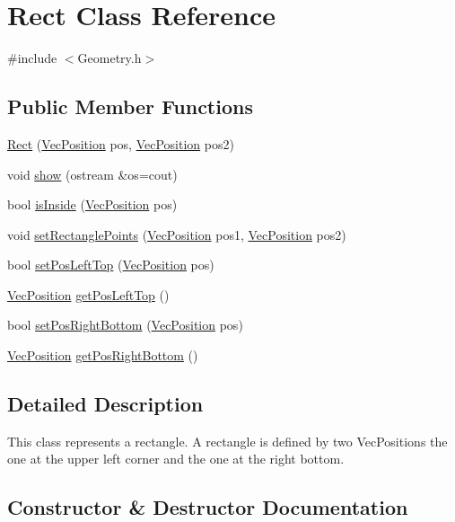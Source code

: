 \hypertarget{classRect}{}\section{Rect Class Reference}
\label{classRect}


{\ttfamily \#include $<$Geometry.\+h$>$}

\subsection*{Public Member Functions}
\begin{DoxyCompactItemize}
\item 
\hyperlink{classRect_acd4ab1dca00830ee6c06334b7aadf0e4}{Rect} (\hyperlink{classVecPosition}{Vec\+Position} pos, \hyperlink{classVecPosition}{Vec\+Position} pos2)
\item 
void \hyperlink{classRect_a2ff82935f25387a30d3159143e5c45c4}{show} (ostream \&os=cout)
\item 
bool \hyperlink{classRect_af52eb79feba16d3e31148957919376ed}{is\+Inside} (\hyperlink{classVecPosition}{Vec\+Position} pos)
\item 
void \hyperlink{classRect_a2f677777aaf238fd6d3ce34e77efae22}{set\+Rectangle\+Points} (\hyperlink{classVecPosition}{Vec\+Position} pos1, \hyperlink{classVecPosition}{Vec\+Position} pos2)
\item 
bool \hyperlink{classRect_a648dc485320cac37f5ab18fd9ae051ce}{set\+Pos\+Left\+Top} (\hyperlink{classVecPosition}{Vec\+Position} pos)
\item 
\hyperlink{classVecPosition}{Vec\+Position} \hyperlink{classRect_a13d10fcc4b6a231d3cc3043494756a00}{get\+Pos\+Left\+Top} ()
\item 
bool \hyperlink{classRect_ae7d9c65731893825164cc5b19f45ef08}{set\+Pos\+Right\+Bottom} (\hyperlink{classVecPosition}{Vec\+Position} pos)
\item 
\hyperlink{classVecPosition}{Vec\+Position} \hyperlink{classRect_aee8996c35d329dcf89ce5177facdea22}{get\+Pos\+Right\+Bottom} ()
\end{DoxyCompactItemize}


\subsection{Detailed Description}
This class represents a rectangle. A rectangle is defined by two Vec\+Positions the one at the upper left corner and the one at the right bottom. 

\subsection{Constructor \& Destructor Documentation}

